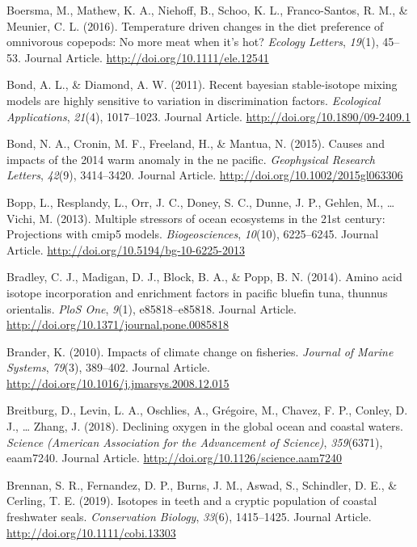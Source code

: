 \documentclass [11pt, proquest] {uwthesis}[2015/03/03]
\begin{document}
\hypertarget{ref-Boersma2015}{}
Boersma, M., Mathew, K. A., Niehoff, B., Schoo, K. L., Franco-Santos, R.
M., \& Meunier, C. L. (2016). Temperature driven changes in the diet
preference of omnivorous copepods: No more meat when it's hot?
\emph{Ecology Letters}, \emph{19}(1), 45--53. Journal Article.
\url{http://doi.org/10.1111/ele.12541}

\hypertarget{ref-Bond2011}{}
Bond, A. L., \& Diamond, A. W. (2011). Recent bayesian stable-isotope
mixing models are highly sensitive to variation in discrimination
factors. \emph{Ecological Applications}, \emph{21}(4), 1017--1023.
Journal Article. \url{http://doi.org/10.1890/09-2409.1}

\hypertarget{ref-Bond2015}{}
Bond, N. A., Cronin, M. F., Freeland, H., \& Mantua, N. (2015). Causes
and impacts of the 2014 warm anomaly in the ne pacific.
\emph{Geophysical Research Letters}, \emph{42}(9), 3414--3420. Journal
Article. \url{http://doi.org/10.1002/2015gl063306}

\hypertarget{ref-Bopp2013}{}
Bopp, L., Resplandy, L., Orr, J. C., Doney, S. C., Dunne, J. P., Gehlen,
M., \ldots{} Vichi, M. (2013). Multiple stressors of ocean ecosystems in
the 21st century: Projections with cmip5 models. \emph{Biogeosciences},
\emph{10}(10), 6225--6245. Journal Article.
\url{http://doi.org/10.5194/bg-10-6225-2013}

\hypertarget{ref-Bradley2014}{}
Bradley, C. J., Madigan, D. J., Block, B. A., \& Popp, B. N. (2014).
Amino acid isotope incorporation and enrichment factors in pacific
bluefin tuna, thunnus orientalis. \emph{PloS One}, \emph{9}(1),
e85818--e85818. Journal Article.
\url{http://doi.org/10.1371/journal.pone.0085818}

\hypertarget{ref-Brander2010}{}
Brander, K. (2010). Impacts of climate change on fisheries.
\emph{Journal of Marine Systems}, \emph{79}(3), 389--402. Journal
Article. \url{http://doi.org/10.1016/j.jmarsys.2008.12.015}

\hypertarget{ref-Brietburg2018}{}
Breitburg, D., Levin, L. A., Oschlies, A., Grégoire, M., Chavez, F. P.,
Conley, D. J., \ldots{} Zhang, J. (2018). Declining oxygen in the global
ocean and coastal waters. \emph{Science (American Association for the
Advancement of Science)}, \emph{359}(6371), eaam7240. Journal Article.
\url{http://doi.org/10.1126/science.aam7240}

\hypertarget{ref-Brennan2019}{}
Brennan, S. R., Fernandez, D. P., Burns, J. M., Aswad, S., Schindler, D.
E., \& Cerling, T. E. (2019). Isotopes in teeth and a cryptic population
of coastal freshwater seals. \emph{Conservation Biology}, \emph{33}(6),
1415--1425. Journal Article. \url{http://doi.org/10.1111/cobi.13303}
\end{document}
